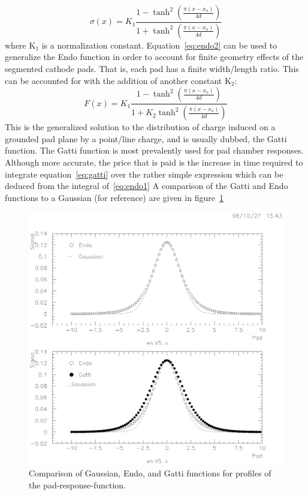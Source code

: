 \documentclass{article}
\begin{document}
\begin{equation}
\sigma(x) = K_{1} \frac{1 - \tanh^{2}(\frac{\pi (x-x_{o})}{4 d})}{1 + \tanh^{2}(\frac{\pi (x-x_{o})}{4 d})}
\label{eq:endo2}
\end{equation}
where K$_{1}$ is a normalization constant.  Equation~\ref{eq:endo2}
can be used to generalize the Endo function in order to account for
finite geometry effects of the segmented cathode pads.  That is, each
pad has a finite width/length ratio.  This can be accounted for with
the addition of another constant K$_{2}$:
\begin{equation}
  F(x) = K_{1} \frac{1 - \tanh^{2}(\frac{\pi (x-x_{o})}{4 d})}{1 + K_{2} \tanh^{2}(\frac{\pi (x-x_{o})}{4 d})}
\label{eq:gatti}
\end{equation}
This is the generalized solution to the distribution of
charge induced on a grounded pad plane by a point/line charge,
and is usually dubbed, the Gatti function.  The Gatti function
is most prevalently used for pad chamber responses.  Although
more accurate, the price that is paid is the increase in time
required to integrate equation~\ref{eq:gatti} over the rather
simple expression which can be deduced from the integral of~\ref{eq:endo1}
A comparison of the Gatti and Endo functions to a Gaussian
(for reference) are given in figure~\ref{fig:gatti}
\begin{figure}[htb]
\begin{center}
\includegraphics[bbllx=18pt,bblly=146pt,bburx=563pt,bbury=691pt,width=.55\textwidth]{./pics/prfShape.ps}
\caption{Comparison of Gaussian, Endo, and Gatti functions for profiles
  of the pad-response-function.}
\label{fig:gatti}
\end{center}
\end{figure}
\end{document}
